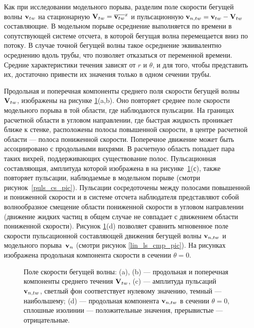 Как при исследовании модельного порыва, разделим поле скорости бегущей волны $\mathbf{v}_{tw}$ на стационарную $\mathbf{V}_{tw} = \overline{\mathbf{v}_{tw}}^{x}$ и пульсационную $\mathbf{v}_{n,tw} = \mathbf{v}_{tw} - \mathbf{V}_{tw}$ составляющие. В модельном порыве осреднение выполняется по времени в сопутствующей системе отсчета, в которой бегущая волна перемещается вниз по потоку. В случае точной бегущей волны такое осреднение эквивалентно осреднению вдоль трубы, что позволяет отказаться от переменной времени. Средние характеристики течения зависят от $r$ и $\theta$, и для того, чтобы представить их, достаточно привести их значения только в одном сечении трубы.

Продольная и поперечная компоненты среднего поля скорости бегущей волны $\mathbf{V}_{tw}$, изображены на рисунке \ref{pipetw_pic}(a,b). Оно повторяет среднее поле скорости модельного порыва в той области, где наблюдаются пульсации. На границах расчетной области в угловом направлении, где быстрая жидкость проникает ближе к стенке, расположены полосы повышенной скорости, в центре расчетной области --- полоса пониженной скорости. Поперечное движение может быть ассоциировано с продольными вихрями. В расчетную область попадает пара таких вихрей, поддерживающих существование полос. Пульсационная составляющая, амплитуда которой изображена в на рисунке~\ref{pipetw_pic}(с), также повторяет пульсации, наблюдаемые в модельном порыве (смотри рисунок~\ref{puls_cs_pic}). Пульсации сосредоточены между полосами повышенной и пониженной скорости и в системе отсчета наблюдателя представляют собой волнообразное смещение области пониженной скорости в угловом направлении (движение жидких частиц в общем случае не совпадает с движением области пониженной скорости). Рисунок \ref{pipetw_pic}(d) позволяет сравнить мгновенное поле скорости пульсационной составляющей движения бегущей волны $\mathbf{v}_{n,tw}$ и модельного порыва~$\mathbf{v}_n$ (смотри рисунок \ref{lin_ls_cmp_pic}). На рисунках изображена продольная компонента скорости в сечении $\theta = 0$. 
 

\begin{figure}
\caption{Поле скорости бегущей волны: (a), (b) --- продольная и поперечная компоненты среднего течения $\mathbf{V}_{tw}$, (c) --- амплитуда пульсаций $\mathbf{v}_{n,tw}$, светлый фон соответствует нулевому значению, темный --- наибольшему; (d) --- продольная компонента $\mathbf{v}_{n,tw}$ в сечении $\theta = 0$, сплошные изолинии --- положительные значения, прерывистые --- отрицательные.}
\label{pipetw_pic}
\end{figure}

